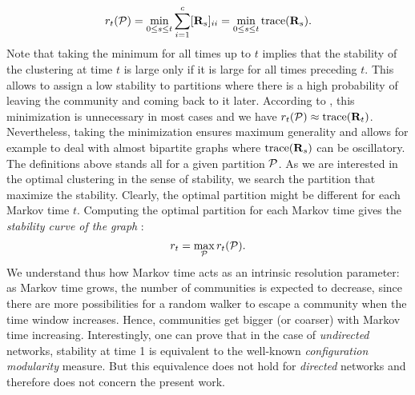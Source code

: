 \begin{equation}
	r_t(\P) = \min_{0 \le s \le t} \sum_{i = 1}^{c} [\b R_s]_{ii} = \min_{0 \le s \le t} \trace(\b R_s).
\end{equation}
Note that taking the minimum for all times up to $t$ implies that the stability of the clustering at time $t$ is large only if it is large for all times preceding $t$. This allows to assign a low stability to partitions where there is a high probability of leaving the community and coming back to it later. According to \cite{delvenne2013stability}, this minimization is unnecessary in most cases and we have $r_t(\P) \approx \trace(\b R_t)$. Nevertheless, taking the minimization ensures maximum generality and allows for example to deal with almost bipartite graphs where $\trace(\b R_s)$ can be oscillatory.
The definitions above stands all for a given partition $\P$. As we are interested in the optimal clustering in the sense of stability, we search the partition that maximize the stability. Clearly, the optimal partition might be different for each Markov time $t$. Computing the optimal partition for each Markov time gives the \textit{stability curve of the graph} :
\begin{equation}
	r_t = \max_{\P} r_t(\P).
\end{equation}
We understand thus how Markov time acts as an intrinsic resolution parameter: as Markov time grows, the number of communities is expected to decrease, since there are more possibilities for a random walker to escape a community when the time window increases. Hence, communities get bigger (or coarser) with Markov time increasing. Interestingly, one can prove that in the case of \textit{undirected} networks, stability at time 1 is equivalent to the well-known \textit{configuration modularity} measure. But this equivalence does not hold for \textit{directed} networks and therefore does not concern the present work.

